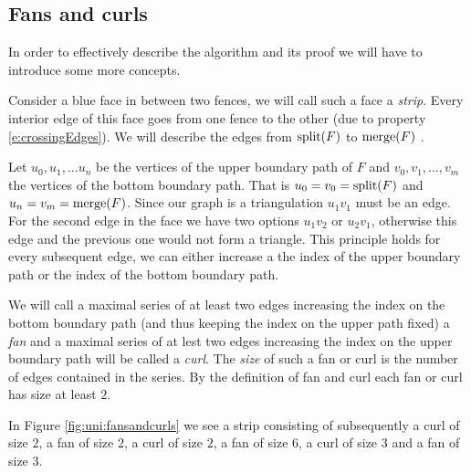  \subsection{Fans and curls}
 In order to effectively describe the algorithm and its proof we will have to introduce some more concepts.

 Consider a blue face in between two fences, we will call such a face a \emph{strip}. Every interior edge of this face goes from one fence to the other (due to property \ref{e:crossingEdges}). We will describe the edges from $\operatorname{split}(F)$ to $\operatorname{merge}(F)$ .

 Let $u_0 , u_1, \ldots u_n$ be the vertices of the upper boundary path of $F$ and $v_0, v_1, \ldots, v_m$ the vertices of the bottom boundary path. That is $u_0=v_0 = \operatorname{split}(F)$ and $u_n = v_m = \operatorname{merge}(F)$. Since our graph is a triangulation $u_1v_1$ must be an edge. For the second edge in the face we have two options $u_1v_2$ or $u_2v_1$, otherwise this edge and the previous one would not form a triangle. This principle holds for every subsequent edge, we can either increase a the index of the upper boundary path or the index of the bottom boundary path.

 We will call a maximal series of at least two edges increasing the index on the bottom boundary path (and thus keeping the index on the upper path fixed) a \emph{fan} and a maximal series of at lest two edges increasing the index on the upper boundary path will be called a \emph{curl}. The \emph{size} of such a fan or curl is the number of edges contained in the series. By the definition of fan and curl each fan or curl has size at least $2$.

 In Figure \ref{fig:uni:fansandcurls} we see a strip consisting of subsequently a curl of size $2$, a fan of size 2, a curl of size $2$, a fan of size $6$, a curl of size $3$ and a fan of size $3$.

